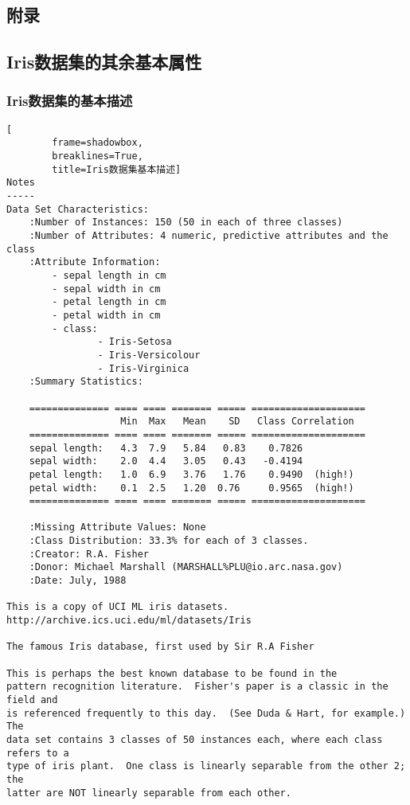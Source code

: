 \documentclass[12pt,a4paper]{article}
\theoremstyle{definition}
\begin{document}
\begin{appendix}
	\section{附录}
	\subsection{Iris数据集的其余基本属性}
	
	\subsubsection{Iris数据集的基本描述}
		\begin{lstlisting}[
		frame=shadowbox,
		breaklines=True,
		title=Iris数据集基本描述]
Notes
-----
Data Set Characteristics:
    :Number of Instances: 150 (50 in each of three classes)
    :Number of Attributes: 4 numeric, predictive attributes and the class
    :Attribute Information:
        - sepal length in cm
        - sepal width in cm
        - petal length in cm
        - petal width in cm
        - class:
                - Iris-Setosa
                - Iris-Versicolour
                - Iris-Virginica
    :Summary Statistics:

    ============== ==== ==== ======= ===== ====================
                    Min  Max   Mean    SD   Class Correlation
    ============== ==== ==== ======= ===== ====================
    sepal length:   4.3  7.9   5.84   0.83    0.7826
    sepal width:    2.0  4.4   3.05   0.43   -0.4194
    petal length:   1.0  6.9   3.76   1.76    0.9490  (high!)
    petal width:    0.1  2.5   1.20  0.76     0.9565  (high!)
    ============== ==== ==== ======= ===== ====================

    :Missing Attribute Values: None
    :Class Distribution: 33.3% for each of 3 classes.
    :Creator: R.A. Fisher
    :Donor: Michael Marshall (MARSHALL%PLU@io.arc.nasa.gov)
    :Date: July, 1988

This is a copy of UCI ML iris datasets.
http://archive.ics.uci.edu/ml/datasets/Iris

The famous Iris database, first used by Sir R.A Fisher

This is perhaps the best known database to be found in the
pattern recognition literature.  Fisher's paper is a classic in the field and
is referenced frequently to this day.  (See Duda & Hart, for example.)  The
data set contains 3 classes of 50 instances each, where each class refers to a
type of iris plant.  One class is linearly separable from the other 2; the
latter are NOT linearly separable from each other.


\end{lstlisting}
\end{appendix}
\end{document}

